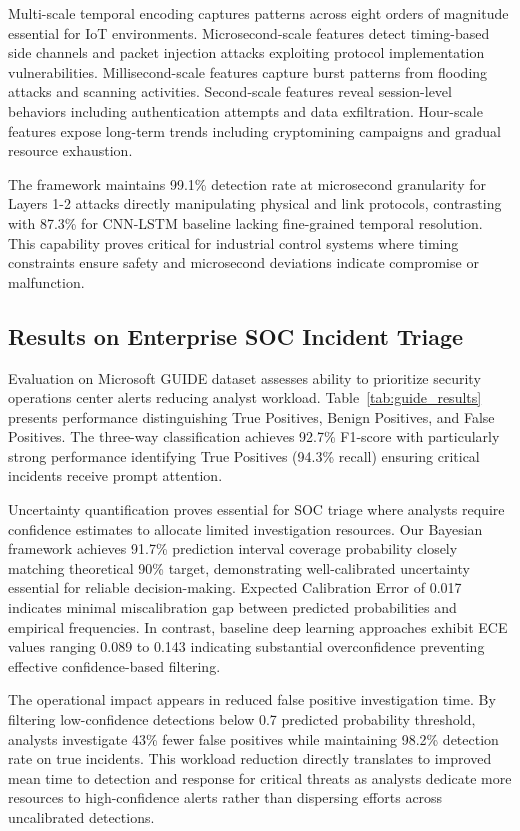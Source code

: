 \documentclass[10pt,journal,compsoc]{IEEEtran}
\begin{document}
Multi-scale temporal encoding captures patterns across eight orders of magnitude essential for IoT environments. Microsecond-scale features detect timing-based side channels and packet injection attacks exploiting protocol implementation vulnerabilities. Millisecond-scale features capture burst patterns from flooding attacks and scanning activities. Second-scale features reveal session-level behaviors including authentication attempts and data exfiltration. Hour-scale features expose long-term trends including cryptomining campaigns and gradual resource exhaustion.

The framework maintains 99.1\% detection rate at microsecond granularity for Layers 1-2 attacks directly manipulating physical and link protocols, contrasting with 87.3\% for CNN-LSTM baseline lacking fine-grained temporal resolution. This capability proves critical for industrial control systems where timing constraints ensure safety and microsecond deviations indicate compromise or malfunction.

\subsection{Results on Enterprise SOC Incident Triage}

Evaluation on Microsoft GUIDE dataset assesses ability to prioritize security operations center alerts reducing analyst workload. Table~\ref{tab:guide_results} presents performance distinguishing True Positives, Benign Positives, and False Positives. The three-way classification achieves 92.7\% F1-score with particularly strong performance identifying True Positives (94.3\% recall) ensuring critical incidents receive prompt attention.

Uncertainty quantification proves essential for SOC triage where analysts require confidence estimates to allocate limited investigation resources. Our Bayesian framework achieves 91.7\% prediction interval coverage probability closely matching theoretical 90\% target, demonstrating well-calibrated uncertainty essential for reliable decision-making. Expected Calibration Error of 0.017 indicates minimal miscalibration gap between predicted probabilities and empirical frequencies. In contrast, baseline deep learning approaches exhibit ECE values ranging 0.089 to 0.143 indicating substantial overconfidence preventing effective confidence-based filtering.

The operational impact appears in reduced false positive investigation time. By filtering low-confidence detections below 0.7 predicted probability threshold, analysts investigate 43\% fewer false positives while maintaining 98.2\% detection rate on true incidents. This workload reduction directly translates to improved mean time to detection and response for critical threats as analysts dedicate more resources to high-confidence alerts rather than dispersing efforts across uncalibrated detections.
\end{document}
